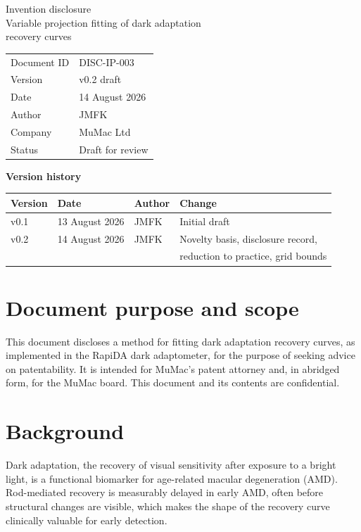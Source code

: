 \documentclass[11pt,a4paper]{article}
\newcommand{\docid}{DISC-IP-003}
\newcommand{\docversion}{v0.2 draft}
\newcommand{\docdate}{14 August 2026}
\begin{document}
\begin{center}
{\LARGE Invention disclosure}\\[2mm]
{\Large Variable projection fitting of dark adaptation\\
recovery curves}\\[6mm]
\begin{tabular}{ll}
\toprule
Document ID & \docid \\
Version & \docversion \\
Date & \docdate \\
Author & JMFK \\
Company & MuMac Ltd \\
Status & Draft for review \\
\bottomrule
\end{tabular}
\end{center}

\vspace{4mm}
\noindent\textbf{Version history}

\noindent\begin{tabular}{llll}
\toprule
Version & Date & Author & Change \\
\midrule
v0.1 & 13 August 2026 & JMFK & Initial draft \\
v0.2 & 14 August 2026 & JMFK & Novelty basis, disclosure record,\\
     &                &      & reduction to practice, grid bounds \\
\bottomrule
\end{tabular}

\vspace{6mm}
\section{Document purpose and scope}
This document discloses a method for fitting dark adaptation recovery
curves, as implemented in the RapiDA dark adaptometer, for the purpose of
seeking advice on patentability. It is intended for MuMac's patent attorney
and, in abridged form, for the MuMac board. This document and its contents
are confidential.

\section{Background}
Dark adaptation, the recovery of visual sensitivity after exposure to a
bright light, is a functional biomarker for age-related macular
degeneration (AMD). Rod-mediated recovery is measurably delayed in early
AMD, often before structural changes are visible, which makes the shape of
the recovery curve clinically valuable for early detection.
\end{document}
